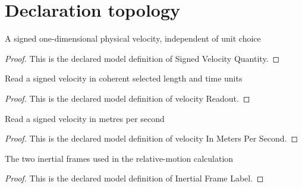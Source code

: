 \section{Declaration topology}
\begin{definition}
  \label{def:physics:phyx-mini-0523:phyxminiproblems-problemphyxmini0523-signedvelocityquantity}
  A signed one-dimensional physical velocity, independent of unit choice
\end{definition}
\begin{proof}
  This is the declared model definition of Signed Velocity Quantity.
\end{proof}
\begin{definition}
  \label{def:physics:phyx-mini-0523:phyxminiproblems-problemphyxmini0523-velocityreadout}
  Read a signed velocity in coherent selected length and time units
\end{definition}
\begin{proof}
  This is the declared model definition of velocity Readout.
\end{proof}
\begin{definition}
  \label{def:physics:phyx-mini-0523:phyxminiproblems-problemphyxmini0523-velocityinmeterspersecond}
  Read a signed velocity in metres per second
\end{definition}
\begin{proof}
  This is the declared model definition of velocity In Meters Per Second.
\end{proof}
\begin{definition}
  \label{def:physics:phyx-mini-0523:phyxminiproblems-problemphyxmini0523-inertialframelabel}
  The two inertial frames used in the relative-motion calculation
\end{definition}
\begin{proof}
  This is the declared model definition of Inertial Frame Label.
\end{proof}
